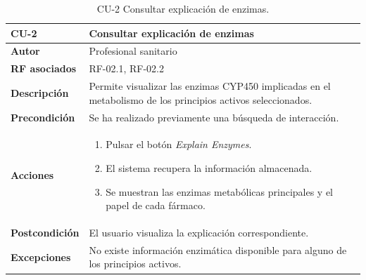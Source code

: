 \begin{table}[ht]
	\centering
	\begin{tabularx}{\linewidth}{ p{} p{} }
		\toprule
		\textbf{CU-2} & \textbf{Consultar explicación de enzimas}\\
		\toprule
		\textbf{Autor} & Profesional sanitario\\
		\textbf{RF asociados} & RF-02.1, RF-02.2\\
		\textbf{Descripción} & Permite visualizar las enzimas CYP450 implicadas en el metabolismo de los principios activos seleccionados.\\
		\textbf{Precondición} & Se ha realizado previamente una búsqueda de interacción.\\
		\textbf{Acciones} &
		\begin{enumerate}
			\item Pulsar el botón \textit{Explain Enzymes}.
			\item El sistema recupera la información almacenada.
			\item Se muestran las enzimas metabólicas principales y el papel de cada fármaco.
		\end{enumerate}\\
		\textbf{Postcondición} & El usuario visualiza la explicación correspondiente.\\
		\textbf{Excepciones} & No existe información enzimática disponible para alguno de los principios activos.\\
		\bottomrule
	\end{tabularx}
	\caption{CU-2 Consultar explicación de enzimas.}
	\label{tab:CU2}
\end{table}

